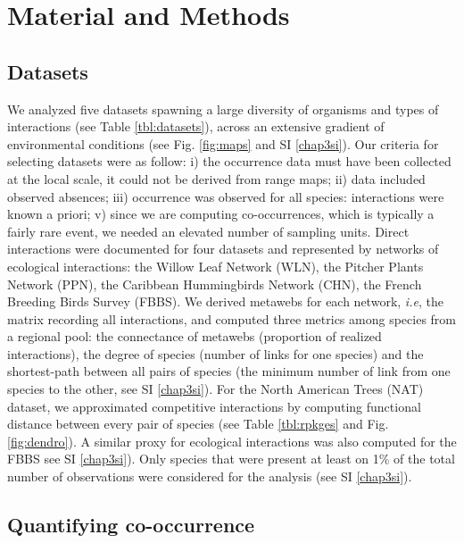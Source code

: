 \section{Material and Methods}\label{material-and-methods}

\subsection{Datasets}\label{datasets}

We analyzed five datasets spawning a large diversity of organisms and
types of interactions (see Table \ref{tbl:datasets}), across an
extensive gradient of environmental conditions (see Fig. \ref{fig:maps}
and SI \ref{chap3si}). Our criteria for selecting datasets were as
follow: i) the occurrence data must have been collected at the local
scale, it could not be derived from range maps; ii) data included
observed absences; iii) occurrence was observed for all species:
interactions were known a priori; v) since we are computing
co-occurrences, which is typically a fairly rare event, we needed an
elevated number of sampling units. Direct interactions were documented
for four datasets and represented by networks of ecological
interactions: the Willow Leaf Network (WLN), the Pitcher Plants Network
(PPN), the Caribbean Hummingbirds Network (CHN), the French Breeding
Birds Survey (FBBS). We derived metawebs for each network, \emph{i.e},
the matrix recording all interactions, and computed three metrics among
species from a regional pool: the connectance of metawebs (proportion of
realized interactions), the degree of species (number of links for one
species) and the shortest-path between all pairs of species (the minimum
number of link from one species to the other, see SI \ref{chap3si}). For
the North American Trees (NAT) dataset, we approximated competitive
interactions by computing functional distance between every pair of
species (see Table \ref{tbl:rpkges} and Fig. \ref{fig:dendro}). A
similar proxy for ecological interactions was also computed for the FBBS
see SI \ref{chap3si}). Only species that were present at least on 1\% of
the total number of observations were considered for the analysis (see
SI \ref{chap3si}).

\subsection{Quantifying co-occurrence}\label{quantifying-co-occurrence}

